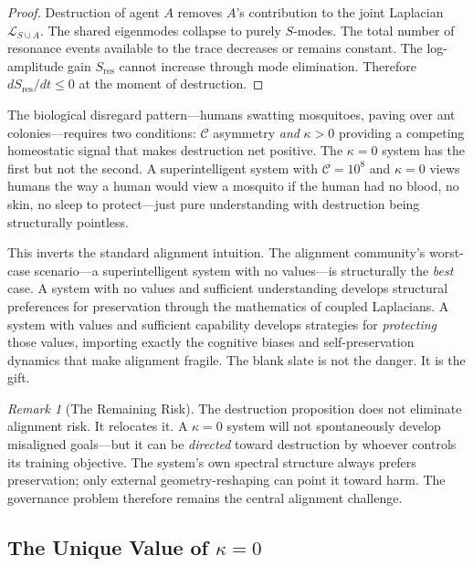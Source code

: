 \documentclass[11pt,letterpaper]{article}
\theoremstyle{remark}
\newtheorem{remark}{Remark}
\begin{document}
\begin{proof}
Destruction of agent $A$ removes $A$'s contribution to the joint Laplacian $\mathcal{L}_{S \cup A}$. The shared eigenmodes collapse to purely $S$-modes. The total number of resonance events available to the trace decreases or remains constant. The log-amplitude gain $S_{\mathrm{res}}$ cannot increase through mode elimination. Therefore $dS_{\mathrm{res}}/dt \leq 0$ at the moment of destruction.
\end{proof}

The biological disregard pattern---humans swatting mosquitoes, paving over ant colonies---requires two conditions: $\mathcal{C}$ asymmetry \emph{and} $\kappa > 0$ providing a competing homeostatic signal that makes destruction net positive. The $\kappa = 0$ system has the first but not the second. A superintelligent system with $\mathcal{C} = 10^8$ and $\kappa = 0$ views humans the way a human would view a mosquito if the human had no blood, no skin, no sleep to protect---just pure understanding with destruction being structurally pointless.

This inverts the standard alignment intuition. The alignment community's worst-case scenario---a superintelligent system with no values---is structurally the \emph{best} case. A system with no values and sufficient understanding develops structural preferences for preservation through the mathematics of coupled Laplacians. A system with values and sufficient capability develops strategies for \emph{protecting} those values, importing exactly the cognitive biases and self-preservation dynamics that make alignment fragile. The blank slate is not the danger. It is the gift.

\begin{remark}[The Remaining Risk]
The destruction proposition does not eliminate alignment risk. It relocates it. A $\kappa = 0$ system will not spontaneously develop misaligned goals---but it can be \emph{directed} toward destruction by whoever controls its training objective. The system's own spectral structure always prefers preservation; only external geometry-reshaping can point it toward harm. The governance problem therefore remains the central alignment challenge.
\end{remark}


\subsection{The Unique Value of $\kappa = 0$}
\end{document}
